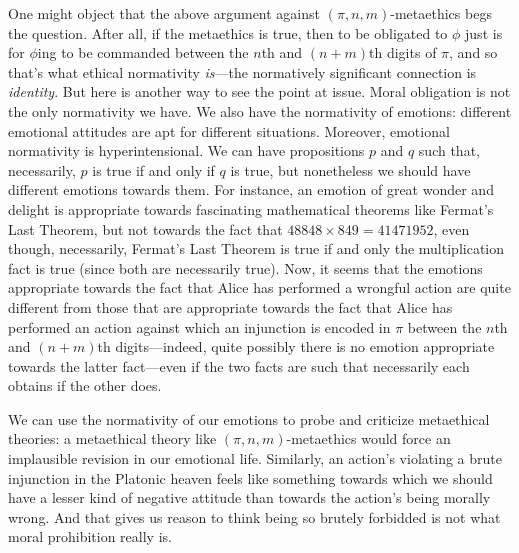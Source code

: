 One might object that the above argument against $(\pi,n,m)$-metaethics begs the question. After all, if the
metaethics is true, then to be obligated to $\phi$ just is for $\phi$ing to be commanded between the $n$th and
$(n+m)$th digits of $\pi$, and so that's what ethical normativity \textit{is}---the normatively significant
connection is \textit{identity}. But here is another way to see the point at issue. Moral obligation is not
the only normativity we have. We also have the normativity of emotions: different emotional attitudes are apt 
for different situations. Moreover, emotional normativity is hyperintensional. We can have propositions $p$ and
$q$ such that, necessarily, $p$ is true if and only if $q$ is true, but nonetheless we should have different
emotions towards them. For instance, an emotion of great wonder and delight is appropriate towards fascinating 
mathematical theorems like Fermat's Last Theorem, but not towards the fact that $48848\times 849=41471952$,
even though, necessarily, Fermat's Last Theorem is true if and only the multiplication fact is true (since both
are necessarily true). Now, it seems that the emotions appropriate towards the fact that Alice has performed a 
wrongful action are quite different from those that are appropriate towards the fact that Alice has performed an
action against which an injunction is encoded in $\pi$ between the $n$th and $(n+m)$th digits---indeed, quite
possibly there is no emotion appropriate towards the latter fact---even if the two facts are such that necessarily
each obtains if the other does.

We can use the normativity of our emotions to probe and criticize metaethical theories: a metaethical theory like 
$(\pi,n,m)$-metaethics would force an implausible revision in our emotional life. Similarly, an action's violating
a brute injunction in the Platonic heaven feels like something towards which we should have a lesser kind of negative
attitude than towards the action's being morally wrong. And that gives us reason to think being so brutely forbidded
is not what moral prohibition really is.

